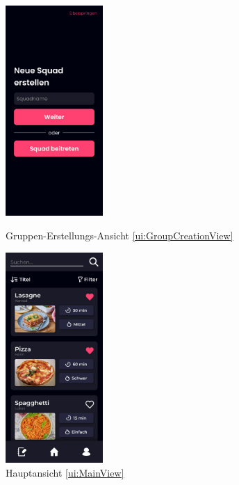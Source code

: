 \documentclass[parskip=full]{scrartcl}
\begin{document}
\begin{figure}[htp]
    \begin{minipage}
        [t]{0.49\textwidth}
        \centering
        \includegraphics[height=80mm]{images/ui/GroupCreationView.jpg}
        \caption{Gruppen-Erstellungs-Ansicht \ref{ui:GroupCreationView}}
        \label{fig:GroupCreationView}
    \end{minipage}
    \begin{minipage}
        [t]{0.49\textwidth}
        \centering
        \includegraphics[height=80mm]{images/ui/MainView.jpg}
        \caption{Hauptansicht \ref{ui:MainView}}
        \label{fig:MainView}
    \end{minipage}
\end{figure}
\end{document}
